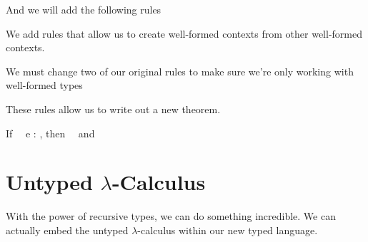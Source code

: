 \documentclass{lecturenotes}
\newcommand{\utype}{\textsf{unit}\xspace}
\newcommand{\unit}{\ensuremath{\textsf{(}\mkern0.5mu\textsf{)}}}
\newcommand{\prodtype}[2]{\ensuremath{#1 \times #2}}
\newcommand{\sumtype}[2]{\ensuremath{#1 + #2}}
\newcommand{\rectype}[2]{\ensuremath{\mu #1.\,#2}}
\begin{document}
\begin{syntax}
   \alternative{\cdot} 
\end{syntax}

And we will add the following rules


We add rules that allow us to create well-formed contexts from other well-formed contexts.

We must change two of our original rules to make sure we're only working with well-formed types

These rules allow us to write out a new theorem.
\begin{thm}
  If \Gamma\, \vdash\, e : \tau, then \cdot\, \vdash\, \Gamma and \cdot\, \vdash\, \tau
\end{thm}

\section{Untyped $\lambda$-Calculus}
With the power of recursive types, we can do something incredible.
We can actually embed the untyped $\lambda$-calculus within our new typed language.
\end{document}
